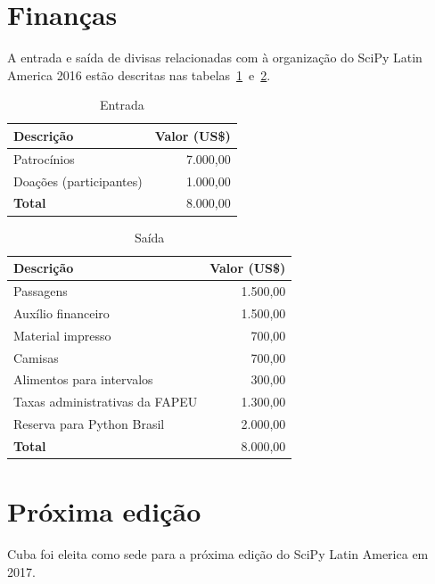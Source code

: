 \documentclass[12pt]{article}
\begin{document}
\section*{Finanças}

A entrada e saída de divisas relacionadas com à organização do SciPy Latin
America 2016 estão descritas nas tabelas~\ref{tab:entrada}~e~\ref{tab:saida}.

\begin{table}[!htb]
  \center
  \caption{Entrada} \label{tab:entrada}
  \begin{tabular}{m{9cm}@{} @{}r}
     \toprule
     \textbf{Descrição} & \textbf{Valor (US\$)} \\
     \midrule
     Patrocínios & 7.000,00 \\
     Doações (participantes) & 1.000,00 \\
     \midrule
     \textbf{Total} & 8.000,00 \\
     \bottomrule
   \end{tabular}
\end{table}

\begin{table}[!htb]
  \center
  \caption{Saída} \label{tab:saida}
  \begin{tabular}{m{9cm}@{} @{}r}
     \toprule
     \textbf{Descrição} & \textbf{Valor (US\$)} \\
     \midrule
     Passagens & 1.500,00 \\
     Auxílio financeiro & 1.500,00 \\
     Material impresso & 700,00 \\
     Camisas & 700,00 \\
     Alimentos para intervalos & 300,00 \\
     Taxas administrativas da FAPEU & 1.300,00 \\
     Reserva para Python Brasil & 2.000,00 \\
     \midrule
     \textbf{Total} & 8.000,00 \\
     \bottomrule
   \end{tabular}
\end{table}

\clearpage
\newpage

\section*{Próxima edição}

Cuba foi eleita como sede para a próxima edição do SciPy Latin America em 2017.
\end{document}

